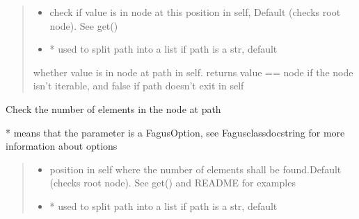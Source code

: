 \documentclass[a4paper,10pt,english]{sphinxmanual}
\begin{document}
\begin{fulllineitems}
\begin{fulllineitems}
\begin{quote}
\begin{description}
\begin{itemize}
\item {}
\sphinxAtStartPar
{} \textendash{} check if value is in node at this position in self, Default  (checks root node). See get()

\item {}
\sphinxAtStartPar
{} \textendash{} * used to split path into a list if path is a str, default 

\end{itemize}

\sphinxAtStartPar
whether value is in node at path in self. returns value == node if the node isn’t iterable, and false if
path doesn’t exit in self

\end{description}\end{quote}

\end{fulllineitems}


\begin{fulllineitems}
\label{\detokenize{fagus:fagus.Fagus.count}}
\pysigstartsignatures
{}
\pysigstopsignatures
\sphinxAtStartPar
Check the number of elements in the node at path

\sphinxAtStartPar
* means that the parameter is a FagusOption, see Fagus\sphinxhyphen{}class\sphinxhyphen{}docstring for more information about options
\begin{quote}\begin{description}
\begin{itemize}
\item {}
\sphinxAtStartPar
{} \textendash{} position in self where the number of elements shall be found.Default  (checks root node). See
get() and README for examples

\item {}
\sphinxAtStartPar
{} \textendash{} * used to split path into a list if path is a str, default 


\end{itemize}
\end{description}
\end{quote}
\end{fulllineitems}
\end{fulllineitems}
\end{document}

